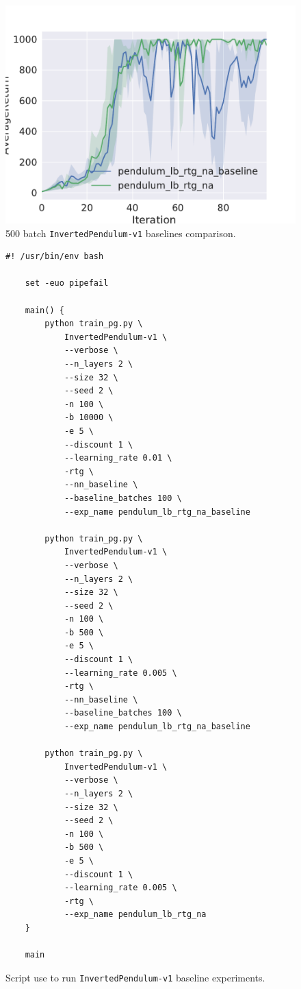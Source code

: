 \begin{figure}[h]
  \centering
  \includegraphics[width=\textwidth]{large_batch_pendulum_comparison.pdf}
  \caption{500 batch \texttt{InvertedPendulum-v1} baselines comparison.}
  \label{fig:baseline-big}
\end{figure}

\begin{figure}
  \centering
  \footnotesize
  \begin{Verbatim}[gobble=4]
    #! /usr/bin/env bash

    set -euo pipefail

    main() {
        python train_pg.py \
            InvertedPendulum-v1 \
            --verbose \
            --n_layers 2 \
            --size 32 \
            --seed 2 \
            -n 100 \
            -b 10000 \
            -e 5 \
            --discount 1 \
            --learning_rate 0.01 \
            -rtg \
            --nn_baseline \
            --baseline_batches 100 \
            --exp_name pendulum_lb_rtg_na_baseline

        python train_pg.py \
            InvertedPendulum-v1 \
            --verbose \
            --n_layers 2 \
            --size 32 \
            --seed 2 \
            -n 100 \
            -b 500 \
            -e 5 \
            --discount 1 \
            --learning_rate 0.005 \
            -rtg \
            --nn_baseline \
            --baseline_batches 100 \
            --exp_name pendulum_lb_rtg_na_baseline

        python train_pg.py \
            InvertedPendulum-v1 \
            --verbose \
            --n_layers 2 \
            --size 32 \
            --seed 2 \
            -n 100 \
            -b 500 \
            -e 5 \
            --discount 1 \
            --learning_rate 0.005 \
            -rtg \
            --exp_name pendulum_lb_rtg_na
    }

    main
  \end{Verbatim}
  \caption{Script use to run \texttt{InvertedPendulum-v1} baseline experiments.}
  \label{fig:baseline-script}
\end{figure}
